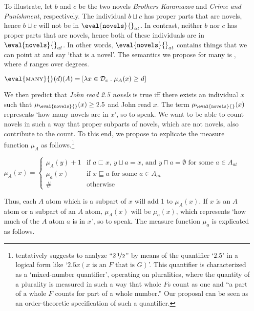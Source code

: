 \documentclass[output=paper]{langscibook}
\begin{document}
\noindent To illustrate, let $b$ and $c$ be the two novels \textit{ Brothers Karamazov} and \textit{ Crime and Punishment}, respectively. The individual $b \sqcup c$ has proper parts that are novels, hence $b \sqcup c$ will not be in $\eval{\texttt{novels}}{}_{at}$. In contrast, neither $b$ nor $c$ has proper parts that are novels, hence both of these individuals are in $\eval{\texttt{novels}}{}_{at}$. In other words, $\eval{\texttt{novels}}{}_{at}$ contains things that we can point at and say `that is a novel'. The semantics we propose for {\sc many} is , where $d$ ranges over degrees.

\ea 
$\eval{\mbox{\sc many}}{}(d)(A) = [\lambda x\in{\mathcal D}_e\;.\;\mu_A(x) \ge d]$  
\label{hai-tri:many}
\z

\noindent We then predict that \textit{John read 2.5 novels} is true iff there exists an individual $x$ such that $\mu_{\eval{\texttt{novels}}{}}(x) \ge 2.5$ and John read $x$. The term $\mu_{\eval{\texttt{novels}}{}}(x)$ represents `how many novels are in $x$', so to speak. We want to be able to count novels in such a way that proper subparts of novels, which are not novels, also contribute to the count. To this end, we propose to explicate the measure function $\mu_A$ as follows.\footnote{\citet{salmon1997} tentatively suggests to analyze ``$2\,\nicefrac{1}{2}$'' by means of the quantifier `$2.5$' in a logical form like `$2.5x(\mbox{$x$ is an $F$ that is $G$})$'. This quantifier is characterized as a `mixed-number quantifier', operating on pluralities, where the quantity of a plurality is measured in such a way that whole $F$s count as one and ``a part of a whole $F$ counts for part of a whole number.'' Our proposal can be seen as an order-theoretic specification of such a quantifier.}

\ea \label{hai-tri:mu-A}
$\mu_A(x)=
\left\{\begin{array}{ll}
\mu_A(y)+1 & \mbox{if $a\sqsubset x$, $y\sqcup a=x$, and $y\sqcap a=\emptyset$ for some $a \in A_{at}$}\\
\mu_a(x)   & \mbox{if $x\sqsubseteq a$ for some $a \in A_{at}$}\\
\#  & \mbox{otherwise}
\end{array}\right.$
\z

\noindent Thus, each $A$ atom which is a subpart of $x$ will add 1 to $\mu_A(x)$. If $x$ is an $A$ atom or a subpart of an $A$ atom, $\mu_A(x)$ will be $\mu_a(x)$, which represents `how much of the $A$ atom $a$ is in $x$', so to speak. The measure function $\mu_a$ is explicated as follows.
     
\end{document}
